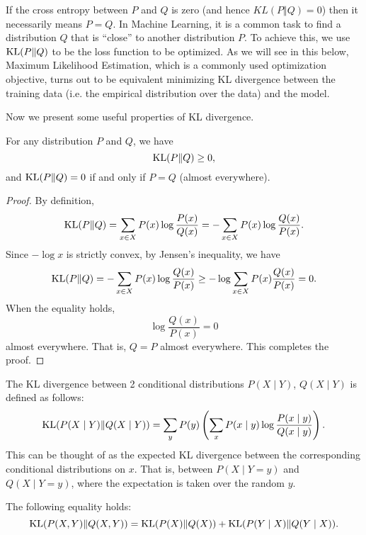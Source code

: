 \documentclass[a4paper]{article}
\begin{document}
If the cross entropy between $P$ and $Q$ is zero 
(and hence $KL(P \Vert Q) = 0$) then it necessarily 
means $P = Q$. In Machine Learning, it is a common 
task to find a distribution $Q$ that is ``close'' to 
another distribution $P$. To achieve this, we use 
$\operatorname{KL}(P \Vert Q)$ to be the loss function to be optimized. 
As we will see in this below, Maximum Likelihood 
Estimation, which is a commonly used optimization objective, 
turns out to be equivalent minimizing KL divergence between 
the training data (i.e. the empirical distribution over the 
data) and the model.

Now we present some useful properties of KL divergence.

\begin{thm}
  For any distribution $P$ and $Q$, we have 
  \[
  \operatorname{KL}(P \Vert Q) \geq 0,
  \]
  and $\operatorname{KL}(P \Vert Q) = 0$ if and only if $P = Q$ (almost 
  everywhere).
\end{thm}

\begin{proof}
  By definition,
  \[
    \operatorname{KL}(P \Vert Q) = \sum_{x \in X} P(x) \log \frac{P(x)}{Q(x)} = - \sum_{x \in X} P(x) \log \frac{Q(x)}{P(x)}.
  \] 
  Since $-\log x$ is strictly convex, by Jensen's inequality, we have
  \[
  \begin{aligned}
    \operatorname{KL}(P \Vert Q) = - \sum_{x \in X} P(x) \log \frac{Q(x)}{P(x)}
    \geq -\log \sum_{x \in X} P(x) \frac{Q(x)}{P(x)} = 0.
  \end{aligned}
  \]
  When the equality holds, 
  \[
  \log \frac{Q(x)}{P(x)} = 0
  \]
  almost everywhere. 
  That is, $Q = P$ almost everywhere. 
  This completes the proof.
\end{proof}

\begin{defi}
  The KL divergence between 2 conditional distributions 
  $P(X \mid Y)$, $Q(X \mid Y)$ is defined as follows:
  \[
  \operatorname{KL}({P(X \mid Y)} \Vert {Q(X \mid Y)}) = \sum_y P(y) 
  \left( \sum_x P(x \mid y) \log 
  \frac{P(x \mid y)}{Q(x \mid y)} \right).
  \]
  This can be thought of as the expected KL divergence 
  between the corresponding conditional distributions on 
  $x$. That is, between $P(X \mid Y = y)$ and $Q(X \mid Y = y)$, 
  where the expectation is taken over the random $y$.
\end{defi}

\begin{thm}
The following equality holds:
\[
\operatorname{KL}({P(X, Y)} \Vert {Q(X, Y)}) = 
\operatorname{KL}({P(X)} \Vert {Q(X)}) + \operatorname{KL}({P(Y \mid X)} 
\Vert {Q(Y \mid X)}).
\]
\end{thm}
\end{document}
